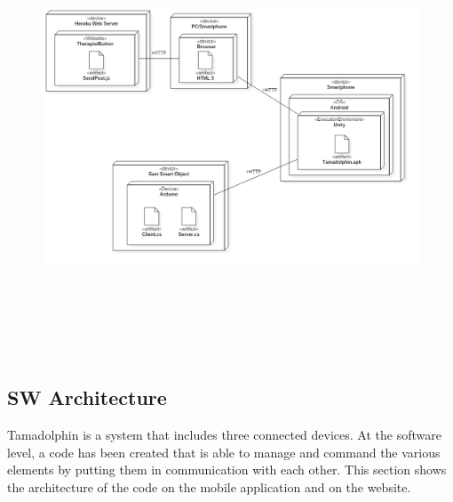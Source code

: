 \documentclass [12pt]{article}
\begin{document}
 \begin{figure}[ht!]
\centering
\includegraphics[height=13cm,width=16cm]{DeploymentDiagram1.jpg}
\end{figure}

\clearpage
\subsection{SW Architecture} 
Tamadolphin is a system that includes three connected devices. At the software level, a code has been created that is able to manage and command the various elements by putting them in communication with each other. This section shows the architecture of the code on the mobile application and on the website. 
\end{document}
